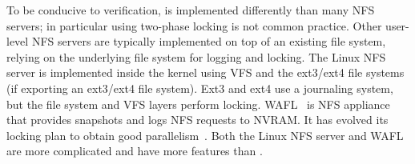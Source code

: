 To be conducive to verification, \sys is implemented differently than
many NFS servers; in particular using two-phase locking is not common
practice.  Other user-level NFS servers are typically implemented on
top of an existing file system, relying on the underlying file system
for logging and locking. The Linux NFS server is implemented inside
the kernel using VFS and the ext3/ext4 file systems (if exporting an
ext3/ext4 file system).  Ext3 and ext4 use a journaling system, but
the file system and VFS layers perform locking.  WAFL~\cite{wafl:hitz}
is NFS appliance that provides snapshots and logs NFS requests to
NVRAM.  It has evolved its locking plan to obtain good
parallelism~\cite{curtis:wafl}.  Both the Linux NFS server and WAFL
are more complicated and have more features than \sys.

